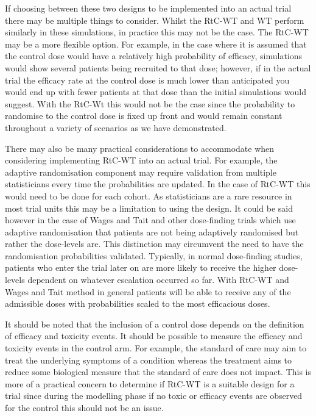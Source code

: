 If choosing between these two designs to be implemented into an actual trial there may be multiple things to consider. Whilst the RtC-WT and WT perform similarly in these simulations, in practice this may not be the case. The RtC-WT may be a more flexible option. For example, in the case where it is assumed that the control dose would have a relatively high probability of efficacy, simulations would show several patients being recruited to that dose; however, if in the actual trial the efficacy rate at the control dose is much lower than anticipated you would end up with fewer patients at that dose than the initial simulations would suggest. With the RtC-Wt this would not be the case since the probability to randomise to the control dose is fixed up front and would remain constant throughout a variety of scenarios as we have demonstrated.

There may also be many practical considerations to accommodate when considering implementing RtC-WT into an actual trial. For example, the adaptive randomisation component may require validation from multiple statisticians every time the probabilities are updated. In the case of RtC-WT this would need to be done for each cohort. As statisticians are a rare resource in most trial units this may be a limitation to using the design. It could be said however in the case of Wages and Tait and other dose-finding trials which use adaptive randomisation that patients are not being adaptively randomised but rather the dose-levels are. This distinction may circumvent the need to have the randomisation probabilities validated. Typically, in normal dose-finding studies, patients who enter the trial later on are more likely to receive the higher dose-levels dependent on whatever escalation occurred so far. With RtC-WT and Wages and Tait method in general patients will be able to receive any of the admissible doses with probabilities scaled to the most efficacious doses.   

It should be noted that the inclusion of a control dose depends on the definition of efficacy and toxicity events. It should be possible to measure the efficacy and toxicity events in the control arm. For example, the standard of care may aim to treat the underlying symptoms of a condition whereas the treatment aims to reduce some biological measure that the standard of care does not impact. This is more of a practical concern to determine if RtC-WT is a suitable design for a trial since during the modelling phase if no toxic or efficacy events are observed for the control this should not be an issue. 


